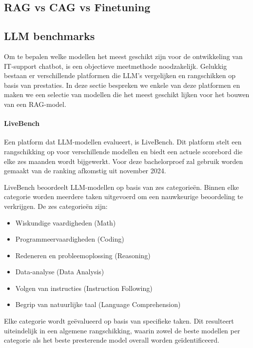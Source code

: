     \subsection{RAG vs CAG vs Finetuning}
    
    
    \subsection{LLM benchmarks}
    Om te bepalen welke modellen het meest geschikt zijn voor de ontwikkeling van IT-support chatbot, is een objectieve meetmethode noodzakelijk. Gelukkig bestaan er verschillende platformen die LLM's vergelijken en rangschikken op basis van prestaties. In deze sectie bespreken we enkele van deze platformen en maken we een selectie van modellen die het meest geschikt lijken voor het bouwen van een RAG-model.
       
    \paragraph{LiveBench} 
    Een platform dat LLM-modellen evalueert, is LiveBench. Dit platform stelt een rangschikking op voor verschillende modellen en biedt een actuele scorebord die elke zes maanden wordt bijgewerkt. Voor deze bachelorproef zal gebruik worden gemaakt van de ranking afkomstig uit november 2024.
    
    LiveBench beoordeelt LLM-modellen op basis van zes categorieën. Binnen elke categorie worden meerdere taken uitgevoerd om een nauwkeurige beoordeling te verkrijgen. De zes categorieën zijn:
    \begin{itemize}
        \item Wiskundige vaardigheden (Math)
        \item Programmeervaardigheden (Coding)
        \item Redeneren en probleemoplossing (Reasoning)
        \item Data-analyse (Data Analysis)
        \item Volgen van instructies (Instruction Following)
        \item Begrip van natuurlijke taal (Language Comprehension)
    \end{itemize}
    
    Elke categorie wordt geëvalueerd op basis van specifieke taken. Dit resulteert uiteindelijk in een algemene rangschikking, waarin zowel de beste modellen per categorie als het beste presterende model overall worden geïdentificeerd.
    
